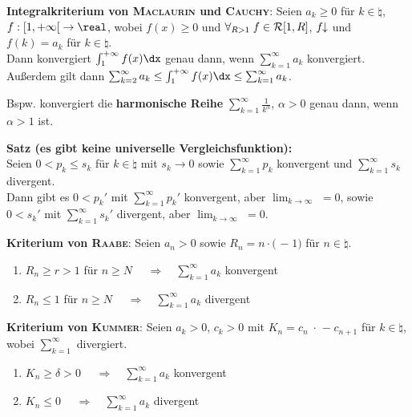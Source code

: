 \textbf{Integralkriterium von \textsc{Maclaurin} und \textsc{Cauchy}}:
Seien $a_k \ge 0$ für $k \in \natural$, \\
$f: \left[1,+\infty\right[ \rightarrow \real$, wobei $f(x) \ge 0$
und $\forall_{R > 1}\; f \in \mathcal{R}[1,R]$, $f\!\!\downarrow$ und $f(k) = a_k$
für $k \in \natural$. \\
Dann konvergiert $\int_1^{+\infty} f(x)\dx$ genau dann, wenn
$\sum_{k=1}^\infty a_k$ konvergiert. \\
Außerdem gilt dann $\sum_{k=2}^\infty a_k \le \int_1^{+\infty} f(x)\dx \le
\sum_{k=1}^\infty a_k$.

Bspw. konvergiert die \textbf{harmonische Reihe}
$\sum_{k=1}^\infty \frac{1}{k^\alpha}$, $\alpha > 0$ genau dann, wenn
$\alpha > 1$ ist.

\linie

\textbf{Satz (es gibt keine universelle Vergleichsfunktion):} \\
Seien $0 < p_k \le s_k$ für $k \in \natural$ mit $s_k \to 0$
sowie $\sum_{k=1}^\infty p_k$ konvergent und $\sum_{k=1}^\infty s_k$
divergent. \\
Dann gibt es $0 < p_k'$ mit
$\sum_{k=1}^\infty p_k'$ konvergent, aber
$\lim_{k \to \infty}$  $= 0$, sowie \\
$0 < s_k'$ mit
$\sum_{k=1}^\infty s_k'$ divergent, aber
$\lim_{k \to \infty}$  $= 0$.

\linie

\textbf{Kriterium von \textsc{Raabe}}:
Seien $a_n > 0$ sowie $R_n = n \cdot \Big($%
 $-\; 1\Big)$
für $n \in \natural$.
\begin{enumerate}
    \item $R_n \ge r > 1$ für $n \ge N$
    $\quad\Rightarrow\quad \sum_{k=1}^\infty a_k$ konvergent
    
    \item $R_n \le 1$ für $n \ge N$
    $\quad\Rightarrow\quad \sum_{k=1}^\infty a_k$ divergent
\end{enumerate}

\textbf{Kriterium von \textsc{Kummer}}:
Seien $a_k > 0$, $c_k > 0$ mit $K_n = c_n \;\cdot$
 $-\; c_{n+1}$ für $k \in \natural$,
wobei $\sum_{k=1}^\infty$  divergiert.
\begin{enumerate}
    \item $K_n \ge \delta > 0$
    $\quad\Rightarrow\quad \sum_{k=1}^\infty a_k$ konvergent
    
    \item $K_n \le 0$
    $\quad\Rightarrow\quad \sum_{k=1}^\infty a_k$ divergent
\end{enumerate}

